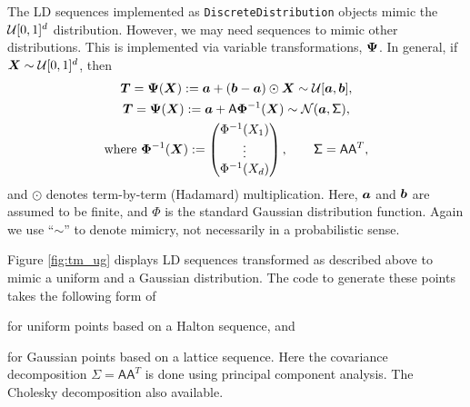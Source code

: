 \documentclass[graybox,footinfo]{svmult}
\newcommand{\mA}{\mathsf{A}}
\newcommand{\mSigma}{\mathsf{\Sigma}}
\begin{document}
The LD sequences implemented as \texttt{DiscreteDistribution} objects mimic the ${\mathcal{U}}[0,1]^d$ distribution.  However, we may need sequences to mimic other distributions.  This is implemented via variable transformations, ${\boldsymbol{\Psi}}$.  In general, if ${\boldsymbol{X}} \sim {\mathcal{U}}[0,1]^d$, then
\begin{subequations} \label{eq:exampleVarTrans}
\begin{gather}
\bsT = \bsPsi(\bsX) := \bsa  + (\bsb - \bsa) \odot \bsX \sim  \calU[\bsa,\bsb], \\
\label{eq:exampleVarTransGauss}
\bsT = \bsPsi(\bsX) := \bsa + \mA \bsPhi^{-1}(\bsX)  \sim \calN(\bsa, \mSigma), \\
\nonumber  \text{where }  \bsPhi^{-1}(\bsX) : = \begin{pmatrix} \Phi^{-1}(X_1) \\ \vdots \\ \Phi^{-1}(X_d)\end{pmatrix}, \qquad \mSigma = \mA \mA^T,
\end{gather}
\end{subequations}
and $\odot$ denotes term-by-term (Hadamard) multiplication.  Here, ${\boldsymbol{a}}$ and ${\boldsymbol{b}}$ are assumed to be finite, and $\Phi$ is the standard Gaussian distribution function.  Again we use ``$\sim$'' to denote mimicry, not necessarily in a probabilistic sense.

Figure \ref{fig:tm_ug} displays LD sequences transformed as described above to mimic a uniform and a Gaussian distribution.  The code to generate these points takes the following form of 

for uniform points based on a Halton sequence, and 

for Gaussian points based on a lattice sequence. Here the covariance decomposition $\mSigma = \mA \mA^T$ is done using principal component analysis. The Cholesky decomposition also available.
\end{document}
